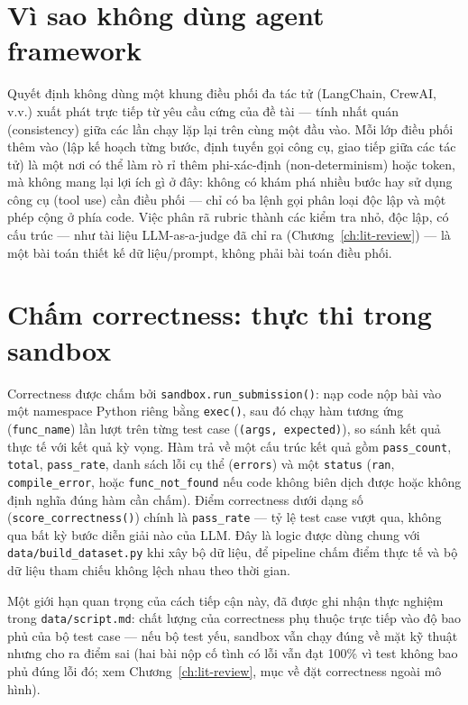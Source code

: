 \documentclass[a4paper,12pt]{report}
\begin{document}
\section{Vì sao không dùng agent framework}

Quyết định không dùng một khung điều phối đa tác tử (LangChain, CrewAI,
v.v.) xuất phát trực tiếp từ yêu cầu cứng của đề tài — tính nhất quán
(consistency) giữa các lần chạy lặp lại trên cùng một đầu vào. Mỗi lớp điều
phối thêm vào (lập kế hoạch từng bước, định tuyến gọi công cụ, giao tiếp
giữa các tác tử) là một nơi có thể làm rò rỉ thêm phi-xác-định
(non-determinism) hoặc token, mà không mang lại lợi ích gì ở đây: không có
khám phá nhiều bước hay sử dụng công cụ (tool use) cần điều phối — chỉ có
ba lệnh gọi phân loại độc lập và một phép cộng ở phía code. Việc phân rã
rubric thành các kiểm tra nhỏ, độc lập, có cấu trúc — như tài liệu
LLM-as-a-judge đã chỉ ra (Chương~\ref{ch:lit-review}) — là một bài toán
thiết kế dữ liệu/prompt, không phải bài toán điều phối.

\section{Chấm correctness: thực thi trong sandbox}

Correctness được chấm bởi \texttt{sandbox.run\_submission()}: nạp code nộp
bài vào một namespace Python riêng bằng \texttt{exec()}, sau đó chạy hàm
tương ứng (\texttt{func\_name}) lần lượt trên từng test case
(\texttt{(args, expected)}), so sánh kết quả thực tế với kết quả kỳ vọng.
Hàm trả về một cấu trúc kết quả gồm \texttt{pass\_count}, \texttt{total},
\texttt{pass\_rate}, danh sách lỗi cụ thể (\texttt{errors}) và một
\texttt{status} (\texttt{ran}, \texttt{compile\_error}, hoặc
\texttt{func\_not\_found} nếu code không biên dịch được hoặc không định
nghĩa đúng hàm cần chấm). Điểm correctness dưới dạng số
(\texttt{score\_correctness()}) chính là \texttt{pass\_rate} — tỷ lệ test
case vượt qua, không qua bất kỳ bước diễn giải nào của LLM. Đây là logic
được dùng chung với \texttt{data/build\_dataset.py} khi xây bộ dữ liệu, để
pipeline chấm điểm thực tế và bộ dữ liệu tham chiếu không lệch nhau theo
thời gian.

Một giới hạn quan trọng của cách tiếp cận này, đã được ghi nhận thực nghiệm
trong \texttt{data/script.md}: chất lượng của correctness phụ thuộc trực
tiếp vào độ bao phủ của bộ test case — nếu bộ test yếu, sandbox vẫn chạy
đúng về mặt kỹ thuật nhưng cho ra điểm sai (hai bài nộp cố tình có lỗi vẫn
đạt 100\% vì test không bao phủ đúng lỗi đó; xem
Chương~\ref{ch:lit-review}, mục về đặt correctness ngoài mô hình).
\end{document}
